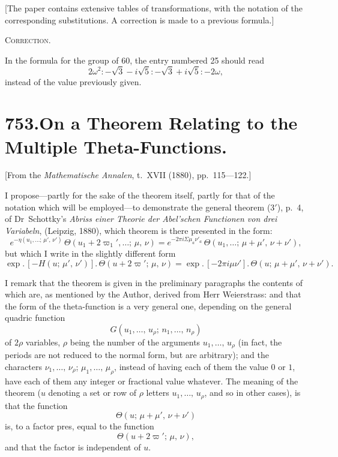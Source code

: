 \documentclass[12pt,a4paper]{article}
\begin{document}
[The paper contains extensive tables of transformations, with the notation of the corresponding substitutions. A correction is made to a previous formula.]

\medskip

\textsc{Correction.}

In the formula for the group of 60, the entry numbered 25 should read
\[
2\omega^2 : -\sqrt{3} - i\sqrt{5} : -\sqrt{3} + i\sqrt{5} : -2\omega,
\]
instead of the value previously given.


\newpage
\section*{\textbf{753.}\quad On a Theorem Relating to the Multiple Theta-Functions.}

[From the \textit{Mathematische Annalen}, t.~XVII (1880), pp.~115---122.]

\medskip

I propose---partly for the sake of the theorem itself, partly for that of the notation which will be employed---to demonstrate the general theorem (3$'$), p.~4, of Dr~Schottky's \textit{Abriss einer Theorie der Abel'schen Functionen von drei Variabeln}, (Leipzig, 1880), which theorem is there presented in the form:
\[
e^{-\eta(u_1,\ldots;\, \mu',\, \nu')}\, \Theta(u_1 + 2\varpi_1',\ldots;\, \mu,\, \nu) = e^{-2\pi i \Sigma \mu_a \nu'_a}\, \Theta(u_1,\ldots;\, \mu + \mu',\, \nu + \nu'), \tag{3$'$}
\]
but which I write in the slightly different form
\[
\exp.\,[-H(u;\, \mu',\, \nu')].\, \Theta(u + 2\varpi';\, \mu,\, \nu) = \exp.\,[-2\pi i \mu\nu'].\, \Theta(u;\, \mu + \mu',\, \nu + \nu').
\]

I remark that the theorem is given in the preliminary paragraphs the contents of which are, as mentioned by the Author, derived from Herr Weierstrass: and that the form of the theta-function is a very general one, depending on the general quadric function
\[
G(u_1,\ldots,\, u_\rho;\, n_1,\ldots,\, n_\rho)
\]
of $2\rho$ variables, $\rho$ being the number of the arguments $u_1,\ldots,\, u_\rho$ (in fact, the periods are not reduced to the normal form, but are arbitrary); and the characters $\nu_1,\ldots,\, \nu_\rho$; $\mu_1,\ldots,\, \mu_\rho$, instead of having each of them the value $0$ or $1$, have each of them any integer or fractional value whatever. The meaning of the theorem ($u$ denoting a set or row of $\rho$ letters $u_1,\ldots,\, u_\rho$, and so in other cases), is that the function
\[
\Theta(u;\, \mu + \mu',\, \nu + \nu')
\]
is, to a factor pres, equal to the function
\[
\Theta(u + 2\varpi';\, \mu,\, \nu),
\]
and that the factor is independent of $u$.
\end{document}

